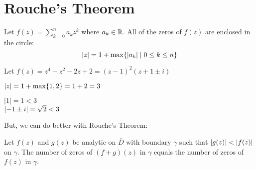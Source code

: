 \documentclass[letterpaper,12pt,fleqn]{article}
\newcommand{\g}{\gamma}
\begin{document}
\section*{Rouche's Theorem}

\begin{theorem}[Cauchy]
  Let $f(z)=\sum_{k=0}^na_kz^k$ where $a_k\in\mathbb{R}$. All of the zeros of $f(z)$
  are enclosed in the circle:
  \[\lvert z\rvert=1+\max\{\lvert a_k\rvert\mid0\le k\le n\}\]
\end{theorem}

\begin{example}
  Let $f(z)=z^4-z^2-2z+2=(z-1)^2(z+1\pm i)$

  $\lvert z\rvert=1+\max\{1,2\}=1+2=3$

  $|1|=1<3$ \\
  $\lvert-1\pm i\rvert=\sqrt{2}<3$
\end{example}

But, we can do better with Rouche's Theorem:

\begin{theorem}
  Let $f(z)$ and $g(z)$ be analytic on $\overline{D}$ with boundary $\g$ such
  that $\lvert g(z)\rvert<\lvert f(z)\rvert$ on $\g$. The number of zeros of $(f+g)(z)$ in
  $\g$ equals the number of zeros of $f(z)$ in $\g$.
\end{theorem}
\end{document}
